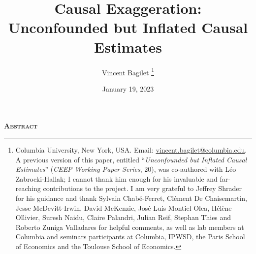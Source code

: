 \documentclass[usletter, 12pt]{article}
\begin{document}

	
	\title{Causal Exaggeration: \\ Unconfounded but Inflated Causal Estimates}

	\author{Vincent Bagilet
		\thanks{Columbia University, New York, USA. Email: \url{vincent.bagilet@columbia.edu}. 
			A previous version of this paper, entitled ``\textit{Unconfounded but Inflated Causal Estimates}'' (\textit{CEEP Working Paper Series}, 20), was co-authored with Léo Zabrocki-Hallak; I cannot thank him enough for his invaluable and far-reaching contributions to the project. I am very grateful to Jeffrey Shrader for his guidance and thank Sylvain Chabé-Ferret, Clément De Chaisemartin, Jesse McDevitt-Irwin, David McKenzie, José Luis Montiel Olea, Hélène Ollivier, Suresh Naidu, Claire Palandri, Julian Reif, Stephan Thies and Roberto Zuniga Valladares for helpful comments, as well as lab members at Columbia and seminars participants at Columbia, IPWSD, the Paris School of Economics and the Toulouse School of Economics.}
	}
	

	\date{January 19, 2023}
	
	
	\maketitle
	
	\begin{center}
		\large \textsc{\textbf{Abstract}}\\
	\end{center}
		
		
		
\end{document}
